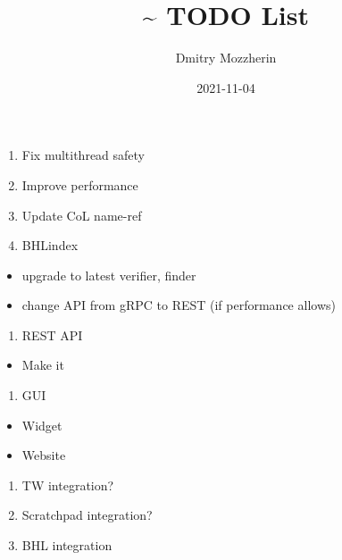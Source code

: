 \documentclass[
]{article}
\title{\textasciitilde{} TODO List}
\author{Dmitry Mozzherin}
\date{2021-11-04}
\providecommand{\tightlist}{%
  \setlength{\itemsep}{0pt}\setlength{\parskip}{0pt}}
\begin{document}
\maketitle

\begin{enumerate}
\def\labelenumi{\arabic{enumi}.}
\item
  Fix multithread safety
\item
  Improve performance
\item
  Update CoL name-ref
\item
  BHLindex
\end{enumerate}

\begin{itemize}
\tightlist
\item
  upgrade to latest verifier, finder
\item
  change API from gRPC to REST (if performance allows)
\end{itemize}

\begin{enumerate}
\def\labelenumi{\arabic{enumi}.}
\setcounter{enumi}{4}
\tightlist
\item
  REST API
\end{enumerate}

\begin{itemize}
\tightlist
\item
  Make it
\end{itemize}

\begin{enumerate}
\def\labelenumi{\arabic{enumi}.}
\setcounter{enumi}{5}
\tightlist
\item
  GUI
\end{enumerate}

\begin{itemize}
\tightlist
\item
  Widget
\item
  Website
\end{itemize}

\begin{enumerate}
\def\labelenumi{\arabic{enumi}.}
\setcounter{enumi}{6}
\item
  TW integration?
\item
  Scratchpad integration?
\item
  BHL integration
\end{enumerate}
\end{document}
